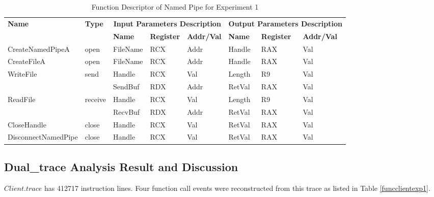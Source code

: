 \begin{table}[H]
  \centering
  \caption{Function Descriptor of Named Pipe for Experiment 1}
  \label{fdescexp1}
  \begin{tabular}{|l|l|l|l|l|l|l|l|}
\hline
             \multirow{2}{*}{{\textbf{Name}}} & \multirow{2}{*}{{\textbf{Type}}} & \multicolumn{3}{c|}{\textbf{Input Parameters Description}} & \multicolumn{3}{c|}{\textbf{Output Parameters Description}} \\
              \cline{3-8} 
             & & \textbf{Name}& \textbf{Register} & \textbf{Addr/Val} & \textbf{Name}& \textbf{Register} &  \textbf{Addr/Val}  \\
             \hline
      CreateNamedPipeA
       &open & FileName & RCX  & Addr &  Handle & RAX & Val\\
      \hline         
      CreateFileA
       &open & FileName & RCX & Addr&  Handle & RAX & Val\\ 
      \hline              
      \multirow{2}{*}{WriteFile}
       &\multirow{2}{*}{send} &  Handle & RCX & Val & Length& R9 &Val\\
        \cline{3-8} 
       & & SendBuf & RDX & Addr & RetVal& RAX & Val\\
      \hline            
      \multirow{2}{*}{ReadFile}
       &\multirow{2}{*}{receive} &  Handle & RCX & Val& Length &R9 & Val\\
        \cline{3-8} 
       & & RecvBuf & RDX  & Addr & RetVal& RAX & Val\\
      \hline            
      CloseHandle &
       close &  Handle & RCX & Val & RetVal& RAX & Val\\
      \hline            
      DisconnectNamedPipe &
      close &  Handle & RCX & Val & RetVal& RAX & Val\\
      \hline               
  \end{tabular}
\end{table}



\subsection{Dual\_trace Analysis Result and Discussion}
$Client.trace$ has 412717 instruction lines. Four function call events were reconstructed from this trace as listed in Table \ref{funcclientexp1}.

